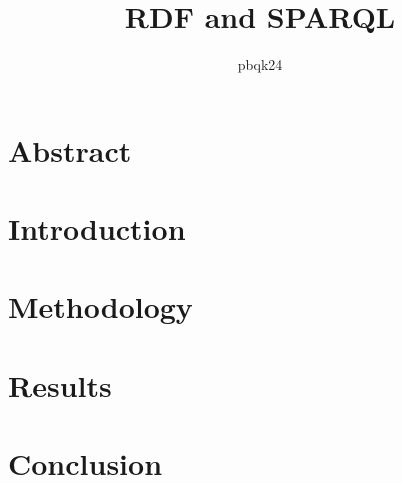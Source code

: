 \documentclass[10pt,a4paper]{article}
\title{\vspace{-2em}RDF and SPARQL}
\author{pbqk24}
\begin{document}
	\maketitle
	
	\vspace{-3em}
	
	\section*{Abstract}
	
	\section*{Introduction}
	
	\section*{Methodology}
	
	\section*{Results}
	
	\section*{Conclusion}
	
\end{document}
